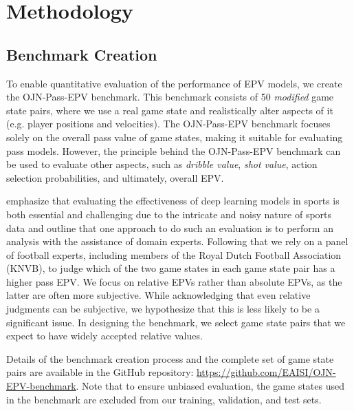\section{Methodology}

\subsection{Benchmark Creation}\label{benchmark_creation}

To enable quantitative evaluation of the performance of EPV models, we create the OJN-Pass-EPV benchmark. This benchmark consists of 50 \textit{modified} game state pairs, where we use a real game state and realistically alter aspects of it (e.g. player positions and velocities). 
The OJN-Pass-EPV benchmark focuses solely on the overall pass value of game states, making it suitable for evaluating pass models. However, the principle behind the OJN-Pass-EPV benchmark can be used to evaluate other aspects, such as \textit{dribble value}, \textit{shot value}, action selection probabilities, and ultimately, overall EPV.

\cite{davis2024methodology} emphasize that evaluating the effectiveness of deep learning models in sports is both essential and challenging due to the intricate and noisy nature of sports data and outline that one approach to do such an evaluation is to perform an analysis with the assistance of domain experts. Following that we rely on a panel of football experts, including members of the Royal Dutch Football Association (KNVB), to judge which of the two game states in each game state pair has a higher pass EPV. We focus on relative EPVs rather than absolute EPVs, as the latter are often more subjective. While acknowledging that even relative judgments can be subjective, we hypothesize that this is less likely to be a significant issue. In designing the benchmark, we select game state pairs that we expect to have widely accepted relative values. 

Details of the benchmark creation process and the complete set of game state pairs are available in the GitHub repository: 
\citep{Overmeer2025} \url{https://github.com/EAISI/OJN-EPV-benchmark}.
Note that to ensure unbiased evaluation, the game states used in the benchmark are excluded from our training, validation, and test sets.

